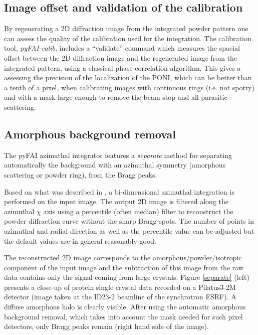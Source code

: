 \documentclass[preprint]{iucr}
\begin{document}
\subsection{Image offset and validation of the calibration}
By regenerating a 2D diffraction image from the integrated powder pattern one
can assess the quality of the calibration used for the integration.
The calibration tool, \textit{pyFAI-calib}, includes  a ``validate'' command
which measures the spacial offset between the 2D diffraction image and the
regenerated image from the integrated pattern, using a classical phase
correlation algorithm.
This gives a assessing the precision of the localization of the PONI, which
can be better than a tenth of a pixel, when calibrating images with continuous
rings (i.e. not spotty) and with a mask large enough to remove the beam stop and
all parasitic scattering.

\subsection{Amorphous background removal}

The pyFAI azimuthal integrator features a \textit{separate} method for
separating automatically the background with an azimuthal symmetry (amorphous
scattering or powder ring), from the Bragg peaks.

Based on what was described in \cite{PyFAI_PDJ}, a bi-dimensional azimuthal
integration is performed on the input image.
The output 2D image is filtered along the azimuthal $\chi$ axis using a
percentile (often median) filter to reconstruct the powder diffraction curve
without the sharp Bragg spots.
The number of points in azimuthal and radial direction as well as
the percentile value can be adjusted but the default values are in
general reasonably good.

The reconstructed 2D image corresponds to the amorphous/powder/isotropic
component of the input image and the subtraction of this image from
the raw data contains only the signal coming from large crystals.
Figure \ref{separate} (left)
presents a close-up of protein single crystal data recorded on a Pilatus3-2M
detector (image taken at the ID23-2 beamline of the synchrotron ESRF).
A diffuse amorphous halo is clearly visible.
After using the automatic amorphous background removal, which takes into account
the mask needed for such pixel detectors, only Bragg peaks remain (right hand
side of the image).
\end{document}
